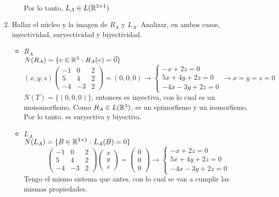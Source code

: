 \begin{enumerate}
\begin{mdframed}[style=s]
\begin{itemize}
\begin{align*}
                        \end{align*}
                        Por lo tanto, $L_A\in L(\mathbb{R}^{3\times1})$
                \end{itemize}
            \end{mdframed}
        \item Hallar el núcleo y la imagen de $R_A$ y $L_A$. Analizar, en ambos casos, inyectividad, suryectividad y biyectividad.
            \begin{mdframed}[style=s]
                \begin{itemize}
                    \item $R_A$\\
                        $N(R_A)=\{v\in\mathbb{R}^3:R_A(v)=\vec{0}\}$\[(x,y,z)\begin{pmatrix}
                            -1&0&2\\5&4&2\\-4&-3&2
                        \end{pmatrix}=(0,0,0)\to\begin{cases}
                            -x+2z=0\\
                            5x+4y+2z=0\\
                            -4x-3y+2z=0
                        \end{cases}\to x=y=z=0\]
                        $N(T)=\{(0,0,0)\}$, entonces es inyectiva, con lo cual es un monomorfismo. Como $R_A\in L(\mathbb{R}^3)$, es un epimorfismo y un isomorfismo. Por lo tanto, es suryectiva y biyectiva.
                    \item $L_A$\\
                        $N(L_A)=\{B\in\mathbb{R}^{3\times1}:L_A(B)=0\}$\[\begin{pmatrix}
                            -1&0&2\\5&4&2\\-4&-3&2
                        \end{pmatrix}\begin{pmatrix}
                            x\\y\\z
                        \end{pmatrix}=\begin{pmatrix}
                            0\\0\\0
                        \end{pmatrix}\to\begin{cases}
                            -x+2z=0\\
                            5x+4y+2z=0\\
                            -4x-3y+2z=0
                        \end{cases}\]
                        Tengo el mismo sistema que antes, con lo cual se van a cumplir las mismas propiedades.
                \end{itemize}
            \end{mdframed}
    \end{enumerate}